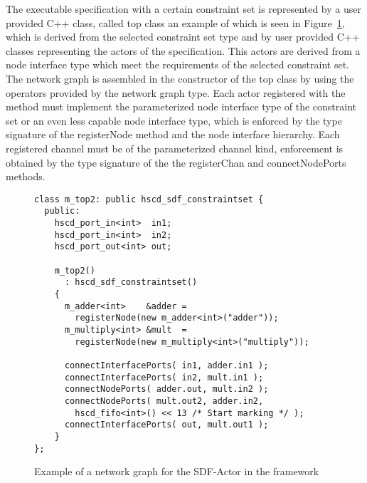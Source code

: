 The executable specification with a certain constraint set is
represented by a user provided C++ class, called top class an example of
which is seen in Figure~\ref{example-sdf-constraintset}, which is
derived from the selected \SysteMoC{} constraint set type and by
user provided C++ classes representing the actors of the specification.
This actors are derived from a \SysteMoC{} node interface type which
meet the requirements of the selected constraint set. The network graph
is assembled in the constructor of the top class by using the
operators provided by the \SysteMoC{} network graph type.
Each actor registered with the  method must implement
the parameterized node interface type of the constraint set or an even
less capable node interface type, which is enforced by the type signature
of the registerNode method and the node interface hierarchy.
Each registered channel must be of the parameterized channel kind,
enforcement is obtained by the type signature of the
the registerChan and connectNodePorts methods.

\begin{figure}[h]
\centering
\begin{verbatim}
class m_top2: public hscd_sdf_constraintset {
  public:
    hscd_port_in<int>  in1;
    hscd_port_in<int>  in2;
    hscd_port_out<int> out;
    
    m_top2()
      : hscd_sdf_constraintset()
    {
      m_adder<int>    &adder =
        registerNode(new m_adder<int>("adder"));
      m_multiply<int> &mult  =
        registerNode(new m_multiply<int>("multiply"));
      
      connectInterfacePorts( in1, adder.in1 );
      connectInterfacePorts( in2, mult.in1 );
      connectNodePorts( adder.out, mult.in2 );
      connectNodePorts( mult.out2, adder.in2,
        hscd_fifo<int>() << 13 /* Start marking */ );
      connectInterfacePorts( out, mult.out1 );
    }
};
\end{verbatim}
\caption{\label{example-sdf-constraintset}Example of a network graph for the SDF-Actor in the \SysteMoC{} framework}
\end{figure}



